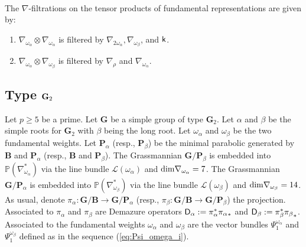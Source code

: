 \documentclass[sn-mathphys-num]{sn-jnl}%
\newcommand{\Ll}{\mathcal L}
\newcommand{\sk}{{\sf k}}
\newcommand{\Pp}{\mathbb P}
\newcommand{\bg}{\mathbf G}
\newcommand{\fb}{\mathbf B}
\newcommand{\bp}{\mathbf P}
\theoremstyle{definition}
\begin{document}
\

The $\nabla$-filtrations on the tensor products of fundamental representations are given by:

 \begin{enumerate}
\item $\nabla _{\omega _{\alpha}}\otimes \nabla _{\omega _{\alpha}}$ is filtered by $\nabla _{2\omega _{\alpha}}, \nabla _{\omega _{\beta}}$, and $\sk$.
\item  $\nabla _{\omega _{\alpha}}\otimes \nabla _{\omega _{\beta}}$ is filtered by $\nabla _{\rho}$ and $\nabla _{\omega _{\alpha}}$.
\end{enumerate}


\subsection{ Type ${\bf G}_2$}\label{subsec:typeG_2}

Let $p\geq 5$ be a prime. Let $ \bg$ be a simple group of type ${ \bg}_2$. Let $\alpha$ and $\beta$ be the simple roots for ${ \bg}_2$ with $\beta$ being the long root. Let $\omega _{\alpha}$ and $\omega _{\beta}$ be the two fundamental weights. Let ${\bp}_{\alpha}$ (resp., ${\bp}_{\beta}$) be the minimal parabolic generated by ${\fb}$ and ${ \bp}_{\alpha}$ (resp., ${\fb}$ and ${ \bp}_{\beta}$). The Grassmannian ${ \bg}/{\bp}_{\beta}$ is embedded into $  \Pp (\nabla _{\omega _{\alpha}}^{\ast})$ via the line bundle $\Ll (\omega _{\alpha})$ and ${\rm dim}\nabla _{\omega _{\alpha}}=7$. The Grassmannian ${ \bg}/{\bp}_{\alpha}$ is embedded into $  \Pp (\nabla _{\omega _{\beta}}^{\ast})$ via the line bundle $\Ll (\omega _{\beta})$ and ${\rm dim}\nabla _{\omega _{\beta}}=14$. As usual, denote $\pi _{\alpha}:{ \bg}/{\fb}\rightarrow { \bg}/{\bp}_{\alpha}$ (resp., $\pi _{\beta}:{ \bg}/{\fb}\rightarrow { \bg}/{\bp}_{\beta}$) the projection. Associated to $\pi _{\alpha}$ and $\pi _{\beta}$ are Demazure operators ${\sf D}_{\alpha}:=\pi _{\alpha}^{\ast}{\pi _{\alpha}}_{\ast}$ and ${\sf D}_{\beta}:=\pi _{\beta}^{\ast}{\pi _{\beta}}_{\ast}$. Associated to the fundamental weights $\omega _{\alpha}$ and $\omega _{\beta}$ are the vector bundles $\Psi _1^{\omega _{\alpha}}$ and $\Psi _1^{\omega _{\beta}}$ defined as in the sequence (\ref{eq:Psi_omega_i}).
\end{document}
